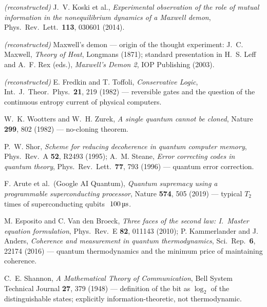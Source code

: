 \begin{description}[leftmargin=3.2em,style=sameline,itemsep=0.3em]
\item[{[B11]}] \emph{(reconstructed)} J.~V. Koski et al., \emph{Experimental
observation of the role of mutual information in the nonequilibrium dynamics of a
Maxwell demon}, Phys.\ Rev.\ Lett.\ \textbf{113}, 030601 (2014).

\item[{[B12]}] \emph{(reconstructed)} Maxwell's demon --- origin of the thought
experiment: J.~C. Maxwell, \emph{Theory of Heat}, Longmans (1871); standard
presentation in H.~S. Leff and A.~F. Rex (eds.), \emph{Maxwell's Demon 2}, IOP
Publishing (2003).

\item[{[B13]}] \emph{(reconstructed)} E. Fredkin and T. Toffoli,
\emph{Conservative Logic}, Int.\ J.\ Theor.\ Phys.\ \textbf{21}, 219 (1982) ---
reversible gates and the question of the continuous entropy current of physical
computers.

\item[{[B14]}] W.~K. Wootters and W.~H. Zurek, \emph{A single quantum cannot be
cloned}, Nature \textbf{299}, 802 (1982) --- no-cloning theorem.

\item[{[B15]}] P.~W. Shor, \emph{Scheme for reducing decoherence in quantum
computer memory}, Phys.\ Rev.\ A \textbf{52}, R2493 (1995); A.~M. Steane,
\emph{Error correcting codes in quantum theory}, Phys.\ Rev.\ Lett.\ \textbf{77},
793 (1996) --- quantum error correction.

\item[{[B16]}] F. Arute et al.\ (Google AI Quantum), \emph{Quantum supremacy using
a programmable superconducting processor}, Nature \textbf{574}, 505 (2019) ---
typical $T_2$ times of superconducting qubits ${\sim}100\,\text{\textmu s}$.

\item[{[B17]}] M. Esposito and C. Van den Broeck, \emph{Three faces of the second
law: I.\ Master equation formulation}, Phys.\ Rev.\ E \textbf{82}, 011143 (2010);
P. Kammerlander and J. Anders, \emph{Coherence and measurement in quantum
thermodynamics}, Sci.\ Rep.\ \textbf{6}, 22174 (2016) --- quantum thermodynamics
and the minimum price of maintaining coherence.

\item[{[B18]}] C.~E. Shannon, \emph{A Mathematical Theory of Communication}, Bell
System Technical Journal \textbf{27}, 379 (1948) --- definition of the bit as
$\log_2$ of the distinguishable states; explicitly information-theoretic, not
thermodynamic.


\end{description}
